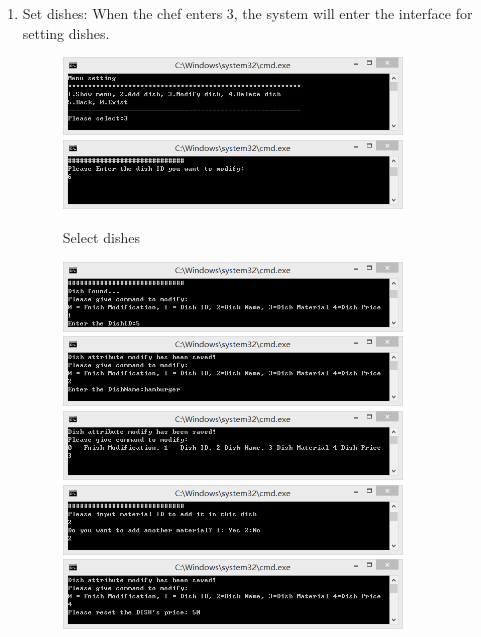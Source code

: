 \documentclass{article}
\begin{document}
\begin{enumerate}
    \item Set dishes:\newline 
    When the chef enters 3, the system will enter the interface for setting dishes.
        \begin{figure}[H]
        \centering
        \includegraphics[width=0.85\textwidth]{Q/1/Q_3a.jpg}
        \includegraphics[width=0.85\textwidth]{Q/1/333331.png}
        \caption{Select dishes}
        \end{figure}
        \begin{figure}[H]
        \centering
        \includegraphics[width=0.85\textwidth]{Q/1/333332.png}
        \includegraphics[width=0.85\textwidth]{Q/1/333333.png}
        \includegraphics[width=0.85\textwidth]{Q/1/333334.png}
        \includegraphics[width=0.85\textwidth]{Q/1/333335.png}
        \includegraphics[width=0.85\textwidth]{Q/1/333336.png}

\end{figure}
\end{enumerate}
\end{document}
